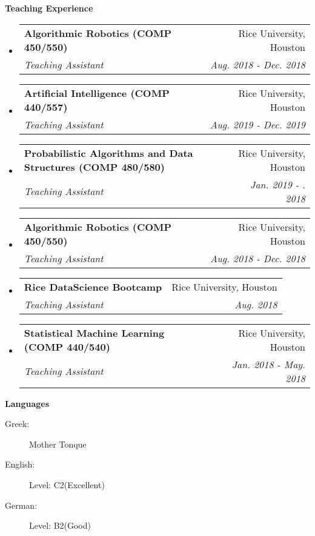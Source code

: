 \documentclass[letterpaper,11pt]{article}
\makeatletter
\newcommand{\resheading}[1]{{\large \colorbox{mygrey}{\begin{minipage}{\textwidth}{\textbf{#1 \vphantom{p\^{E}}}}\end{minipage}}}}
\newcommand{\ressubheading}[4]{
\begin{tabular*}{7.0in}{l@{\extracolsep{\fill}}r}
		\textbf{#1} & #2 \\
		\textit{#3} & \textit{#4} \\
\end{tabular*}\vspace{-6pt}}
\makeatother
\begin{document}
\resheading{Teaching Experience}
\begin{itemize}
	\item
	\ressubheading{Algorithmic Robotics (COMP  450/550) }
	{Rice University, Houston}{Teaching Assistant}
	{Aug. 2018 - Dec. 2018}
	\item
	\ressubheading{Artificial Intelligence (COMP  440/557) }
	{Rice University, Houston}{Teaching Assistant}
	{Aug. 2019 - Dec. 2019}
	\item
	\ressubheading{Probabilistic Algorithms and Data Structures (COMP  480/580)}
	{Rice University, Houston}{Teaching Assistant}
	{Jan. 2019 - . 2018}
	\item
	\ressubheading{Algorithmic Robotics (COMP  450/550) }
	{Rice University, Houston}{Teaching Assistant}
	{Aug. 2018 - Dec. 2018}
	\item
	\ressubheading{Rice DataScience Bootcamp}
	{Rice University, Houston}{Teaching Assistant}
	{Aug. 2018}
	\item
	\ressubheading{Statistical Machine Learning (COMP 440/540)}
	{Rice University, Houston}{Teaching Assistant}
	{Jan. 2018 - May. 2018}
\end{itemize}

\resheading{Languages}
\begin{description}
	\item[Greek:] Mother Tonque 
	\item[English:] Level: C2(Excellent)
	\item[German:] Level: B2(Good)
\end{description}

	
\end{document}
